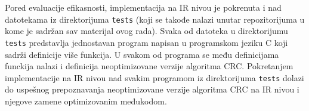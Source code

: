 \documentclass[12pt,oneside]{memoir}
\begin{document}

Pored evaluacije efikasnosti, implementacija na IR nivou je pokrenuta i nad datotekama iz direktorijuma \texttt{tests} (koji se takođe nalazi unutar repozitorijuma u kome je sadržan sav materijal ovog rada). Svaka od datoteka u direktorijumu \texttt{tests} predstavlja jednostavan program napisan u programskom jeziku C koji sadrži definicije više funkcija. U svakom od programa se među definicijama funckija nalazi i definicija neoptimizovane verzije algoritma CRC. Pokretanjem implementacije na IR nivou nad svakim programom iz direktorijuma \texttt{tests} dolazi do uspešnog prepoznavanja neoptimizovane verzije algoritma CRC na IR nivou i njegove zamene optimizovanim međukodom. 



    
    



\end{document}

